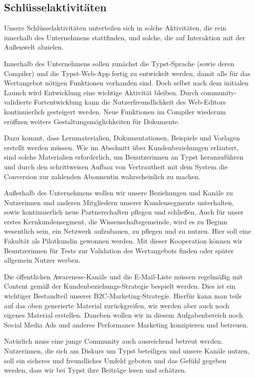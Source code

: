 \documentclass[11pt, a4paper]{article}
\newcommand{\gender}{\raisebox{-.25em}{*}}
\renewcommand{\glossary} {\marginsymbol{$\hookrightarrow$}}
\newcommand{\marginsymbol}[1] {\protect\marginsymbolhelper{#1}}
\newcommand{\marginsymbolhelper}[1] {\tabto*{-1cm}\makebox[0cm]{#1}\tabto*{\TabPrevPos}}
\begin{document}
\subsection*{Schlüsselaktivitäten}

Unsere Schlüsselaktivitäten unterteilen sich in solche Aktivitäten, die rein innerhalb des Unternehmens stattfinden, und solche, die auf Interaktion mit der Außenwelt abzielen.


Innerhalb des Unternehmens sollen zunächst die \glossary Typst-Sprache (sowie deren Compiler) und die Typst-Web-App fertig zu entwickelt werden, damit alle für das Wertangebot nötigen Funktionen vorhanden sind. Doch selbst nach dem initialen Launch wird Entwicklung eine wichtige Aktivität bleiben. Durch community-validierte Fortentwicklung kann die Nutzerfreundlichkeit des Web-Editors kontinuierlich gesteigert werden. Neue Funktionen im Compiler wiederum eröffnen weitere Gestaltungsmöglichkeiten für Dokumente.

Dazu kommt, dass Lernmaterialien, Dokumentationen, Beispiele und Vorlagen erstellt werden müssen. Wie im Abschnitt über Kundenbeziehungen erläutert, sind solche Materialien erforderlich, um Benutzer\gender{}innen an Typst heranzuführen und durch den schrittweisen Aufbau von Vertrautheit mit dem System die Conversion zur\gender{} zahlenden Abonnent\gender{}in wahrscheinlich zu machen.

Außerhalb des Unternehmens wollen wir unsere Beziehungen und Kanäle zu Nutzer\gender{}innen und anderen Mitgliedern unserer Kundensegmente unterhalten, sowie kontinuierlich neue Partnerschaften pflegen und schließen. Auch für unser erstes Kernkundensegment, die Wissenschaftsgemeinde, wird es zu Beginn wesentlich sein, ein Netzwerk aufzubauen, zu pflegen und zu nutzen. Hier soll eine Fakultät als Pilotkundin gewonnen werden. Mit dieser Kooperation können wir Benutzer\gender{}innen für Tests zur Validation des Wertangebots finden oder später allgemein Nutzer werben.

Die öffentlichen Awareness-Kanäle und die E-Mail-Liste müssen regelmäßig mit Content gemäß der Kundenbeziehungs-Strategie bespielt werden. Dies ist ein wichtiger Bestandteil unserer B2C-Marketing-Strategie. Hierfür kann man teils auf das oben generierte Material zurückgreifen, wir werden aber auch noch eigenes Material erstellen. Daneben wollen wir in diesem Aufgabenbereich noch Social Media Ads und anderes Performance Marketing konzipieren und betreuen.

Natürlich muss eine junge Community auch ausreichend betreut werden. Nutzer\gender{}innen, die sich am Diskurs um Typst beteiligen und unsere Kanäle nutzen, soll ein sicheres und freundliches Umfeld geboten und das Gefühl gegeben werden, dass wir bei Typst ihre Beiträge lesen und schätzen.
\end{document}
